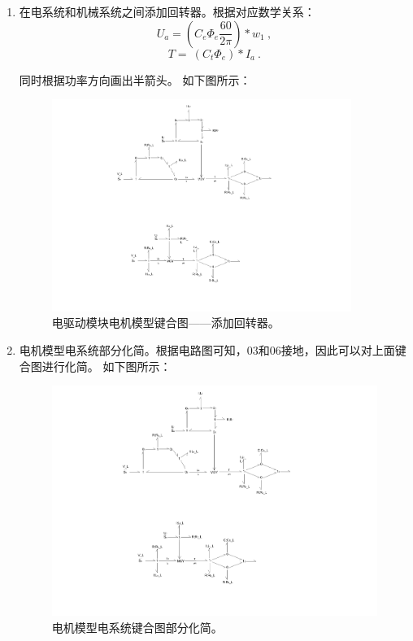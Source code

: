 \begin{enumerate}
	\item 在电系统和机械系统之间添加回转器。根据对应数学关系：
	\begin{equation}
	\label{equ:U_a}
	U_a
	=
	\left( C_e \Phi_e \frac{60}{2 \pi}\right) * w_1
	\ ,
	\end{equation}
	\begin{equation}
	\label{equ:T}
	T
	=\
	(C_t \Phi_e) * I_a
	\ .
	\end{equation}
	
	同时根据功率方向画出半箭头。
	如下图所示：	
	\begin{figure}[!h]
		\centering
		\includegraphics[width=0.92\textwidth]{fig/4_3_bond.pdf}
		\caption{电驱动模块电机模型键合图——添加回转器。}\label{fig:4_3_bond}
	\end{figure}
	
	\item 电机模型电系统部分化简。根据电路图可知，03和06接地，因此可以对上面键合图进行化简。
	如下图所示：
	\begin{figure}[!h]
		\centering
		\includegraphics[width=1.2\textwidth]{fig/4_4_bond.pdf}
		\caption{电机模型电系统键合图部分化简。}\label{fig:4_4_bond}
	\end{figure}
	

\end{enumerate}
